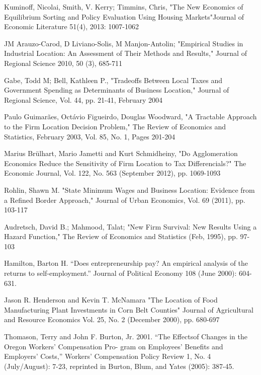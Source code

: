 \documentclass[12pt,a4paper]{article}
\begin{document}
\begin{thebibliography}{99}
Kuminoff, Nicolai, Smith, V. Kerry; Timmins, Chris, "The New Economics of Equilibrium Sorting and Policy Evaluation Using Housing Markets"Journal of Economic Literature 51(4), 2013: 1007-1062   

JM Arauzo-Carod, D Liviano-Solis, M Manjon-Antolin; "Empirical Studies in Industrial Location: An Assessment of Their Methods and Results," Journal of Regional Science 2010, 50 (3), 685-711

Gabe, Todd M; Bell, Kathleen P., "Tradeoffs Between Local Taxes and Government Spending as Determinants of Business Location," Journal of Regional Science, Vol. 44, pp. 21-41, February 2004 

Paulo Guimarães, Octávio Figueirdo, Douglas Woodward, "A Tractable Approach to the Firm Location Decision Problem," The Review of Economics and Statistics, February 2003, Vol. 85, No. 1, Pages 201-204

Marius Brülhart, Mario Jametti and Kurt Schmidheiny, "Do Agglomeration Economics Reduce the Sensitivity of Firm Location to Tax Differencials?" The Economic Journal, Vol. 122, No. 563 (September 2012), pp. 1069-1093

Rohlin, Shawn M. "State Minimum Wages and Business Location: Evidence from a Refined Border Approach," Journal of Urban Economics, Vol. 69 (2011), pp. 103-117

Audretsch, David B.; Mahmood, Talat; "New Firm Survival: New Results Using a Hazard Function," The Review of Economics and Statistics (Feb, 1995), pp. 97-103

Hamilton, Barton H. “Does entrepreneurship pay? An empirical analysis of the returns to self-employment.”  Journal of Political Economy 108 (June 2000): 604-631.

Jason R. Henderson and Kevin T. McNamara "The Location of Food Manufacturing Plant Investments in Corn Belt Counties" Journal of Agricultural and Resource Economics
Vol. 25, No. 2 (December 2000), pp. 680-697 

Thomason, Terry and John F. Burton, Jr. 2001. “The Effectsof Changes in the Oregon Workers’ Compensation Pro-
gram on Employees’ Benefits and Employers’ Costs,” Workers’ Compensation Policy Review 1, No. 4 (July/August): 7-23, reprinted in Burton, Blum, and Yates (2005): 387-45. 


\end{thebibliography}
\end{document}
